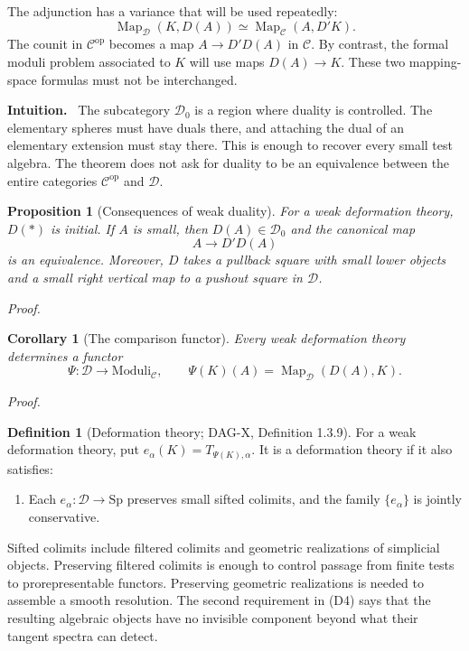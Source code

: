 \documentclass[12pt,letterpaper,oneside]{report}
\newtheorem{proposition}[theorem]{Proposition}
\newtheorem{corollary}[theorem]{Corollary}
\theoremstyle{definition}
\newtheorem{definition}[theorem]{Definition}
\theoremstyle{remark}
\renewenvironment{proof}[1][Proof]{\par\nopagebreak[4]\addvspace{4pt}\noindent\textit{#1.}\par\nobreak\vspace{0.5\baselineskip}}{\par\addvspace{4pt}}
\newenvironment{intuition}{\par\noindent\textbf{Intuition.}\ }{\par}
\newcommand{\Sp}{\mathrm{Sp}}
\newcommand{\cC}{\mathcal C}
\newcommand{\cD}{\mathcal D}
\newcommand{\FMP}{\mathrm{Moduli}}
\newcommand{\Map}{\operatorname{Map}}
\newcommand{\op}{\mathrm{op}}
\newcommand{\term}{*}
\begin{document}
The adjunction has a variance that will be used repeatedly:
\[
 \Map_{\cD}(K,D(A))\simeq\Map_{\cC}(A,D'K).
\]
The counit in $\cC^{\op}$ becomes a map $A\to D'D(A)$ in $\cC$. By contrast, the formal moduli problem associated to $K$ will use maps $D(A)\to K$. These two mapping-space formulas must not be interchanged.

\begin{intuition}
The subcategory $\cD_0$ is a region where duality is controlled. The elementary spheres must have duals there, and attaching the dual of an elementary extension must stay there. This is enough to recover every small test algebra. The theorem does not ask for duality to be an equivalence between the entire categories $\cC^{\op}$ and $\cD$.
\end{intuition}

\begin{proposition}[Consequences of weak duality]
\label{prop:weak-duality}
For a weak deformation theory, $D(\term)$ is initial. If $A$ is small, then $D(A)\in\cD_0$ and the canonical map
\[
 A\longrightarrow D'D(A)
\]
is an equivalence. Moreover, $D$ takes a pullback square with small lower objects and a small right vertical map to a pushout square in $\cD$.
\end{proposition}
\begin{proof}
\end{proof}


\begin{corollary}[The comparison functor]
\label{cor:comparison}
Every weak deformation theory determines a functor
\[
 \Psi:\cD\longrightarrow\FMP_{\cC},\qquad
 \Psi(K)(A)=\Map_{\cD}(D(A),K).
\]
\end{corollary}
\begin{proof}
\end{proof}


\begin{definition}[Deformation theory; DAG-X, Definition 1.3.9]
For a weak deformation theory, put $e_\alpha(K)=T_{\Psi(K),\alpha}$. It is a deformation theory if it also satisfies:
\begin{enumerate}[label=\textup{(D4)}]
\item Each $e_\alpha:\cD\to\Sp$ preserves small sifted colimits, and the family $\{e_\alpha\}$ is jointly conservative.
\end{enumerate}
\end{definition}

Sifted colimits include filtered colimits and geometric realizations of simplicial objects. Preserving filtered colimits is enough to control passage from finite tests to prorepresentable functors. Preserving geometric realizations is needed to assemble a smooth resolution. The second requirement in (D4) says that the resulting algebraic objects have no invisible component beyond what their tangent spectra can detect.
\end{document}
